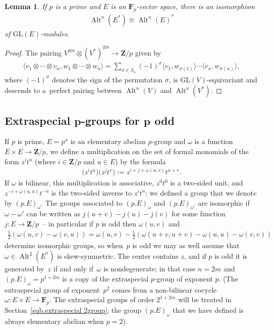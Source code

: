 \documentclass[pdftex]{sigma}
\numberwithin{equation}{section}
\newtheorem{Lemma}[Theorem]{Lemma}
\newcommand\bF{\mathbf F}
\newcommand\bZ{\mathbf Z}
\newcommand\<\langle
\renewcommand\>\rangle
\DeclareMathOperator\Alt{Alt}
\newcommand{\GL}{\mathrm{GL}}
\begin{document}
\begin{Lemma}
If $p$ is a prime and $E$ is an $\bF_p$-vector space, there is an isomorphism
\begin{gather*}
\Alt^n(E^*) \cong \Alt^n(E)^*
\end{gather*}
of $\GL(E)$-modules.
\end{Lemma}

\begin{proof}The pairing $V^{\otimes n} \otimes (V^*)^{\otimes n} \to \bZ/p$ given by
\begin{gather*}
\langle v_1 \otimes \cdots \otimes v_n, w_1 \otimes \cdots \otimes w_n\> = \sum_{\sigma \in S_n} (-1)^\sigma \langle v_1, w_{\sigma(1)}\rangle \cdots \langle v_n, w_{\sigma (n)}\rangle,
\end{gather*}
 where $(-1)^\sigma$ denotes the sign of the permutation $\sigma$, is $\GL(V)$-equivariant and descends to a~perfect pairing between $\Alt^n(V)$ and $\Alt^n(V^*)$.
\end{proof}

\subsection[Extraspecial $p$-groups for $p$ odd]{Extraspecial $\boldsymbol{p}$-groups for $\boldsymbol{p}$ odd}

If $p$ is prime, $E = p^n$ is an elementary abelian $p$-group and $\omega$ is a function $E \times E \to \bZ/p$, we define a multiplication on the set of formal monomials of the form $z^i t^u$ (where $i \in \bZ/p$ and $u \in E$) by the formula
\begin{gather*}
\big(z^i t^u\big)\big(z^j t^v\big) := z^{i+j + \omega(u,v)} t^{u+v}.
\end{gather*}
If $\omega$ is bilinear, this multiplication is associative, $z^0 t^0$ is a two-sided unit, and $z^{-i+\omega(u,u)}t^{-u}$ is the two-sided inverse to $z^i t^u$: we defined a group that we denote by $(p.E)_{\omega}$. The groups associated to $(p.E)_{\omega}$ and $(p.E)_{\omega'}$ are isomorphic if $\omega - \omega'$ can be written as $j(u+v) - j(u) - j(v)$ for some function $j\colon E \to \bZ/p$~-- in particular if $p$ is odd then $\omega(u,v)$ and
\begin{gather*}
\tfrac{1}{2} (\omega(u,v) - \omega(v,u) ) = \omega(u,v) - \tfrac{1}{2} (\omega(u+v,u+v) - \omega(u,u)-\omega(v,v) )
\end{gather*}
determine isomorphic groups, so when~$p$ is odd we may as well assume that $\omega \in \Alt^2(E^*)$ is skew-symmetric. The center contains $z$, and if $p$ is odd it is generated by~$z$ if and only if~$\omega$ is nondegenerate; in that case $n = 2m$ and $(p.E)_{\omega} = p^{1+2m}$ is a copy of the extraspecial $p$-group of exponent $p$. (The extraspecial group of exponent~$p^2$ comes from a non-bilinear cocycle $\omega\colon E \times E \to \bF_p$. The extraspecial groups of order $2^{1+2m}$ will be treated in Section~\ref{sub.extraspecial 2group}; the group $(p.E)_{\omega}$ that we have defined is always elementary abelian when $p = 2$).
\end{document}
